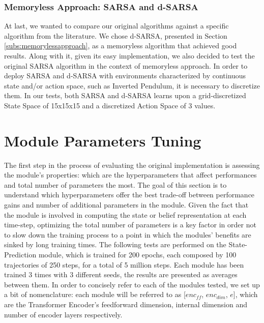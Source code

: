                
            \subsubsection{Memoryless Approach: SARSA and d-SARSA}
                At last, we wanted to compare our original algorithms against a specific algorithm from the literature. We chose d-SARSA, presented in Section \ref{subs:memorylessapproach}, as a memoryless algorithm that achieved good results. Along with it, given its easy implementation, we also decided to test the original SARSA algorithm in the context of memoryless approach. \newline
                In order to deploy SARSA and d-SARSA with environments characterized by continuous state and/or action space, such as Inverted Pendulum, it is necessary to discretize them. In our tests, both SARSA and d-SARSA learns upon a grid-discretized State Space of 15x15x15 and a discretized Action Space of 3 values.
                
                
    \newpage
    \section{Module Parameters Tuning}
    \label{results:module_tuning}
        The first step in the process of evaluating the original implementation is assessing the module's properties: which are the hyperparameters that affect performances and total number of parameters the most. The goal of this section is to understand which hyperparameters offer the best trade-off between performance gains and number of additional parameters in the module. Given the fact that the module is involved in computing the state or belief representation at each time-step, optimizing the total number of parameters is a key factor in order not to slow down the training process to a point in which the modules' benefits are sinked by long training times. \newline
        The following tests are performed on the State-Prediction module, which is trained for 200 epochs, each composed by 100 trajectories of 250 steps, for a total of 5 million steps. Each module has been trained 3 times with 3 different seeds, the results are presented as averages between them. In order to concisely refer to each of the modules tested, we set up a bit of nomenclature: each module will be referred to as [$enc_{ff}$, $enc_{dim}$, $e$], which are the Transformer Encoder's feedforward dimension, internal dimension and number of encoder layers respectively. 
        
